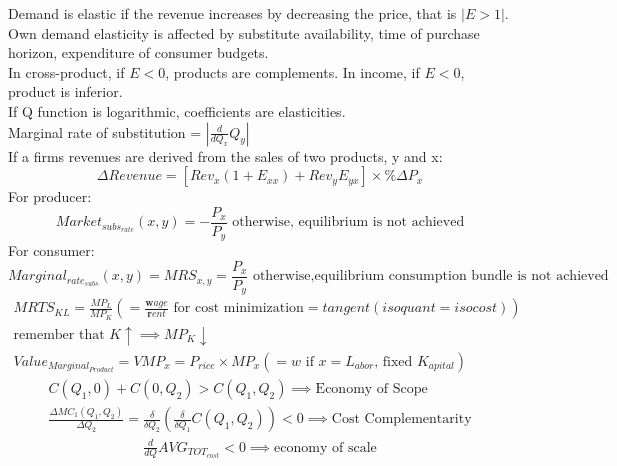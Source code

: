 \documentclass[nobib,fleqn,8pt]{article}
\begin{document}
Demand is elastic if the revenue increases by decreasing the price, that is $|E>1|$.\\
Own demand elasticity is affected by substitute availability, time of purchase horizon, expenditure of consumer budgets.\\
In cross-product, if $E<0$, products are complements. In income, if $E<0$, product is inferior.\\
If Q function is logarithmic, coefficients are elasticities.\\
Marginal rate of substitution = $|\frac{d}{dQ_x}Q_y|$\\
If a firms revenues are derived from the sales of two products, y and x:
\begin{equation*}
    \Delta Revenue = [Rev_x(1+E_{xx})+Rev_y E_{yx}]\times \%\Delta P_x
\end{equation*}
For producer:
\begin{equation*}
    Market_{subs_{rate}}(x,y) = -\frac{P_x}{P_y} \text{ otherwise, equilibrium is not achieved}
\end{equation*}
For consumer:
\begin{equation*}
    Marginal_{rate_{subs}}(x,y) =MRS_{x,y} =  \frac{P_x}{P_y} \text{ otherwise,equilibrium consumption bundle is not achieved}
\end{equation*}
\begin{eqnarray*}
    MRTS_{KL} = \frac{MP_L}{MP_K} ( = \frac{\mathbf{w}age}{\mathbf{r}ent} \text{ for cost minimization} = tangent(isoquant=isocost))\\
    \text{remember that } K\uparrow \implies MP_K \downarrow\\
    Value_{Marginal_{Product}}= VMP_x = P_{rice}\times MP_x (= w \text{ if $x=L_{abor}$, fixed }K_{apital})
\end{eqnarray*}
\begin{eqnarray*}
    C(Q_1,0)+C(0,Q_2)>C(Q_1,Q_2) \implies \text{Economy of Scope}\\
    \frac{\Delta MC_1(Q_1,Q_2)}{\Delta Q_2} = \frac{\delta}{\delta Q_2}(\frac{\delta}{\delta Q_1} C(Q_1,Q_2))< 0 \implies \text{Cost Complementarity}
\end{eqnarray*}
\begin{eqnarray*}
    \frac{d}{dQ}AVG_{TOT_{cost}}<0 \implies \text{economy of scale}
\end{eqnarray*}
\end{document}
